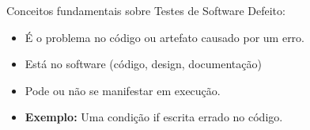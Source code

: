\begin{frame}{Conceitos fundamentais sobre Testes de Software}
    Defeito:
    \begin{itemize}
        \item É o problema no código ou artefato causado por um erro.
        \item Está no software (código, design, documentação)
        \item Pode ou não se manifestar em execução.
        \item \textbf{Exemplo:} Uma condição if escrita errado no código.
    \end{itemize}
\end{frame}